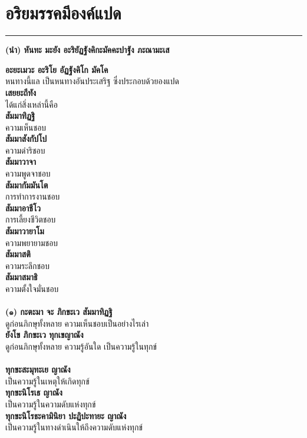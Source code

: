\documentclass[12pt]{article}
\begin{document}
\section{อริยมรรคมีองค์แปด}
\hrule
\begin{center}
\textbf{(นำ) หันทะ มะยัง อะริยัฏฐังคิกะมัคคะปาฐัง ภะณามะเส}\\
\end{center}
\textbf{อะยะเมวะ อะริโย อัฏฐังคิโก มัคโค}\\
หนทางนี้แล เป็นหนทางอันประเสริฐ ซึ่งประกอบด้วยองแปด\\
\textbf{เสยยะถีทัง}\\
\indent ได้แก่สิ่งเหล่านี้คือ\\
\textbf{สัมมาทิฏฐิ}\\
\indent ความเห็นชอบ\\
\textbf{สัมมาสังกัปโป}\\
\indent ความดำริชอบ\\
\textbf{สัมมาวาจา}\\
\indent ความพูดจาชอบ\\
\textbf{สัมมากัมมันโต}\\
\indent การทำการงานชอบ\\
\textbf{สัมมาอาชีโว}\\
\indent การเลี้ยงชีวิตชอบ\\
\textbf{สัมมาวายาโม}\\
\indent ความพยายามชอบ\\
\textbf{สัมมาสติ}\\
\indent ความระลึกชอบ\\
\textbf{สัมมาสมาธิ}\\
\indent ความตั้งใจมั่นชอบ\\
\\
\textbf{(๑) กะตะมา จะ ภิกขะเว สัมมาทิฏฐิ}\\
\indent ดูก่อนภิกษุทั้งหลาย ความเห็นชอบเป็นอย่างไรเล่า\\
\textbf{ยังโข ภิกขะเว ทุกเขญาณัง}\\
\indent ดูก่อนภิกษุทั้งหลาย ความรู้อันใด เป็นความรู้ในทุกข์\\
\\
\textbf{ทุกขะสะมุทะเย ญาณัง}\\
\indent เป็นความรู้ในเหตุให้เกิดทุกข์\\
\textbf{ทุกขะนิโรเธ ญาณัง}\\
\indent เป็นความรู้ในความดับแห่งทุกข์\\
\textbf{ทุกขะนิโรธะคามินิยา ปะฏิปะทายะ ญาณัง}\\
\indent เป็นความรู้ในทางดำเนินให้ถึงความดับแห่งทุกข์\\
\end{document}
